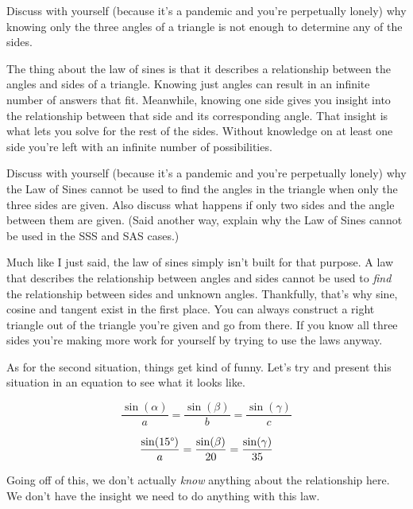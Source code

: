 \begin{problem}[35]
    Discuss with yourself (because it's a pandemic and you're perpetually lonely) why knowing only the three angles of a triangle is not enough to determine any of the sides.
\end{problem}

\begin{solution}
    The thing about the law of sines is that it describes a relationship between the angles and sides of a triangle. Knowing just angles can result in an infinite number of answers that fit. Meanwhile, knowing one side gives you insight into the relationship between that side and its corresponding angle. That insight is what lets you solve for the rest of the sides. Without knowledge on at least one side you're left with an infinite number of possibilities. 
\end{solution}

\begin{problem}[36]
    Discuss with yourself (because it's a pandemic and you're perpetually lonely) why the Law of Sines cannot be used to find the angles in the triangle when only the three sides are given. Also discuss what happens if only two sides and the angle between them are given. (Said another way, explain why the Law of Sines cannot be used in the SSS and SAS cases.)
\end{problem}

\begin{solution}
    Much like I just said, the law of sines simply isn't built for that purpose. A law that describes the relationship between angles and sides cannot be used to \emph{find} the relationship between sides and unknown angles. Thankfully, that's why sine, cosine and tangent exist in the first place. You can always construct a right triangle out of the triangle you're given and go from there. If you know all three sides you're making more work for yourself by trying to use the laws anyway. 
    
    As for the second situation, things get kind of funny. Let's try and present this situation in an equation to see what it looks like.
    
    \[\frac{\sin(\alpha)}{a} = \frac{\sin(\beta)}{b} = \frac{\sin(\gamma)}{c} \]
    
    \[\frac{\sin(15\degree)}{a} = \frac{\sin(\beta)}{20} = \frac{\sin(\gamma)}{35} \]
    
    Going off of this, we don't actually \emph{know} anything about the relationship here. We don't have the insight we need to do anything with this law.
\end{solution}